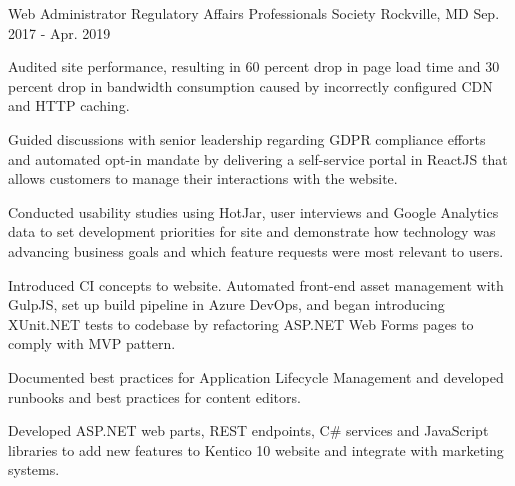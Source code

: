 \begin{cventries}
  \cventry
    {Web Administrator} %
    {Regulatory Affairs Professionals Society} %
    {Rockville, MD} %
    {Sep. 2017 - Apr. 2019} %
    {
      \begin{cvitems} %
		\item {Audited site performance, resulting in 60 percent drop in page load time and 30 percent drop in bandwidth consumption caused by incorrectly configured CDN and HTTP caching.}
		\item {Guided discussions with senior leadership regarding GDPR compliance efforts and automated opt-in mandate by delivering a self-service portal in ReactJS that allows customers to manage their interactions with the website.}
		\item {Conducted usability studies using HotJar, user interviews and Google Analytics data to set development priorities for site and demonstrate how technology was advancing business goals and which feature requests were most relevant to users.}        
        \item {Introduced CI concepts to website. Automated front-end asset management with GulpJS, set up build pipeline in Azure DevOps, and began introducing XUnit.NET tests to codebase by refactoring ASP.NET Web Forms pages to comply with MVP pattern.}
        \item {Documented best practices for Application Lifecycle Management and developed runbooks and best practices for content editors.}
        \item {Developed ASP.NET web parts, REST endpoints, C\# services and JavaScript libraries to add new features to Kentico 10 website and integrate with marketing systems.}
      \end{cvitems}
    }


\end{cventries}
